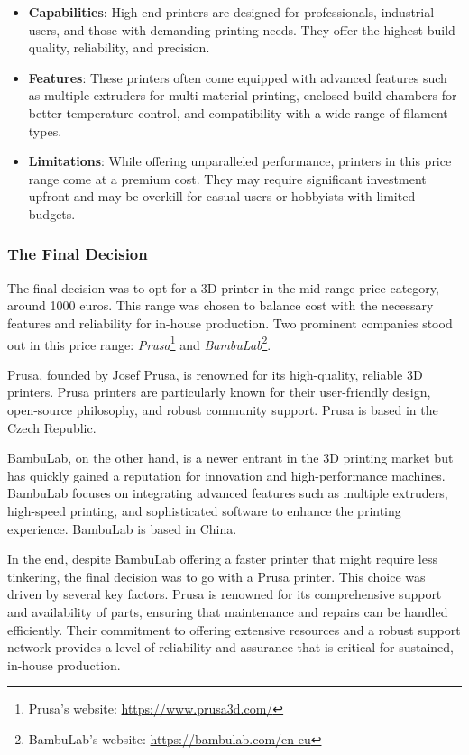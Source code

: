 \begin{itemize}
    \item \textbf{Capabilities}: High-end printers are designed for professionals, industrial 
    users, and those with demanding printing needs. They offer the highest build quality, 
    reliability, and precision.
    \item \textbf{Features}: These printers often come equipped with advanced features such as 
    multiple extruders for multi-material printing, enclosed build chambers for better temperature 
    control, and compatibility with a wide range of filament types.
    \item \textbf{Limitations}: While offering unparalleled performance, printers in this price 
    range come at a premium cost. They may require significant investment upfront and may be 
    overkill for casual users or hobbyists with limited budgets.
\end{itemize}


\subsubsection*{The Final Decision}

The final decision was to opt for a 3D printer in the mid-range price category, around 1000 euros. 
This range was chosen to balance cost with the necessary features and reliability for in-house 
production. Two prominent companies stood out in this price range: 
\textit{Prusa}\footnote{Prusa's website: \url{https://www.prusa3d.com/}} and 
\textit{BambuLab}\footnote{BambuLab's website: \url{https://bambulab.com/en-eu}}.

Prusa, founded by Josef Prusa, is renowned for its high-quality, reliable 3D printers. Prusa 
printers are particularly known for their user-friendly design, open-source philosophy, and robust 
community support. Prusa is based in the Czech Republic.

BambuLab, on the other hand, is a newer entrant in the 3D printing market but has quickly gained a 
reputation for innovation and high-performance machines. BambuLab focuses on integrating advanced 
features such as multiple extruders, high-speed printing, and sophisticated software to enhance 
the printing experience. BambuLab is based in China.

In the end, despite BambuLab offering a faster printer that might require less tinkering, the 
final decision was to go with a Prusa printer. This choice was driven by several key factors. 
Prusa is renowned for its comprehensive support and availability of parts, ensuring that 
maintenance and repairs can be handled efficiently. Their commitment to offering extensive 
resources and a robust support network provides a level of reliability and assurance that is 
critical for sustained, in-house production.

